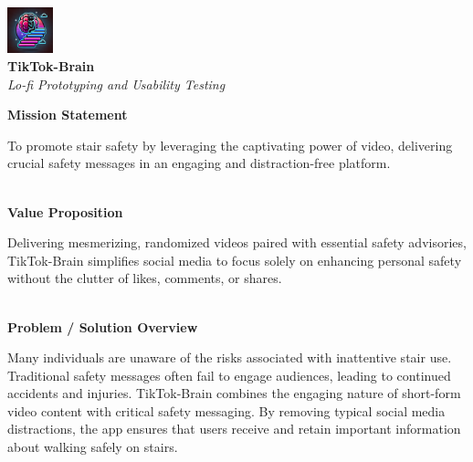 \documentclass{article}
\begin{document}
\begin{titlepage}
    \begin{center}

        \includegraphics[width=0.1\textwidth]{./resources/logo.png} \\
        \vspace{0.5cm}
        {\Huge \textbf{TikTok-Brain}} \\[0.5cm]
        {\LARGE \textit{Lo-fi Prototyping and Usability Testing}} \\[2cm]

    \end{center}

    \noindent
    \textbf{\textcolor{TikTokLightBlue}{\Large Mission Statement}} \\[0.3cm]
    \parbox{\textwidth}{
        \large
        To promote stair safety by leveraging the captivating power of video,
        delivering crucial safety messages in an engaging and distraction-free platform.
    } \\[1cm]

    \noindent
    \textbf{\textcolor{TikTokBlack}{\Large Value Proposition}} \\[0.3cm]
    \parbox{\textwidth}{
        \large
        Delivering mesmerizing, randomized videos paired with essential safety advisories,
        TikTok-Brain simplifies social media to focus solely on enhancing personal safety without the clutter of likes, comments, or shares.
    } \\[1cm]


    \noindent
    \textbf{\textcolor{TikTokRed}{\Large Problem / Solution Overview}} \\[0.3cm]
    \parbox{\textwidth}{
        \large
        Many individuals are unaware of the risks associated with inattentive stair use.
        Traditional safety messages often fail to engage audiences, leading to continued accidents and injuries.
        TikTok-Brain combines the engaging nature of short-form video content with critical safety messaging.
        By removing typical social media distractions,
        the app ensures that users receive and retain important information about walking safely on stairs.
    } \\[1.5cm]


\end{titlepage}
\end{document}
